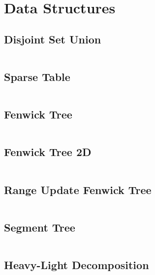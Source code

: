\documentclass[a4paper, 10pt, twocolumn, landscape]{article}
\begin{document}
 
  \section{Data Structures}
  \subsection{Disjoint Set Union}
  \inputminted{cpp}{data-structures/dsu.cpp}
  \subsection{Sparse Table}
  \inputminted{cpp}{data-structures/sparse.cpp}
  \subsection{Fenwick Tree}
  \inputminted{cpp}{data-structures/bit.cpp}
  \subsection{Fenwick Tree 2D}
  \inputminted{cpp}{data-structures/bit2d.cpp}
  \subsection{Range Update Fenwick Tree}
  \inputminted{cpp}{data-structures/bit-range.cpp}
  \subsection{Segment Tree}
  \inputminted{cpp}{data-structures/segtree.cpp}
  \subsection{Heavy-Light Decomposition}
  \inputminted{cpp}{data-structures/hld.cpp}
\end{document}
